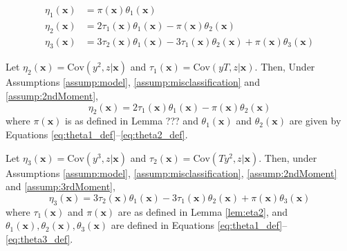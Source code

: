 \begin{align*}
 \eta_1(\mathbf{x}) &= \pi(\mathbf{x})\theta_1(\mathbf{x}) \\
  \eta_2(\mathbf{x}) &=  2\tau_1(\mathbf{x}) \theta_1(\mathbf{x}) - \pi(\mathbf{x})\theta_2(\mathbf{x}) \\
  \eta_3(\mathbf{x}) &=  3\tau_2(\mathbf{x}) \theta_1(\mathbf{x}) - 3\tau_1(\mathbf{x}) \theta_2(\mathbf{x}) + \pi(\mathbf{x})\theta_3(\mathbf{x})
\end{align*}




\begin{lem}
  Let $\eta_2(\mathbf{x}) = \mbox{Cov}(y^2,z|\mathbf{x})$ and $\tau_1(\mathbf{x}) = \mbox{Cov}(yT,z|\mathbf{x})$.
Then, Under Assumptions \ref{assump:model}, \ref{assump:misclassification} and \ref{assump:2ndMoment}, 
\[
    \eta_2(\mathbf{x}) =  2\tau_1(\mathbf{x}) \theta_1(\mathbf{x}) - \pi(\mathbf{x})\theta_2(\mathbf{x})
\]
where $\pi(\mathbf{x})$ is as defined in Lemma ??? and $\theta_1(\mathbf{x})$ and $\theta_2(\mathbf{x})$ are given by Equations \ref{eq:theta1_def}--\ref{eq:theta2_def}.
  \label{lem:eta2}
\end{lem}

 


\begin{lem}
  Let $\eta_3(\mathbf{x}) = \mbox{Cov}(y^3,z|\mathbf{x})$ and $\tau_2(\mathbf{x}) = \mbox{Cov}(Ty^2,z|\mathbf{x})$.
  Then, under Assumptions \ref{assump:model}, \ref{assump:misclassification}, \ref{assump:2ndMoment} and \ref{assump:3rdMoment},
\[
  \eta_3(\mathbf{x}) =  3\tau_2(\mathbf{x}) \theta_1(\mathbf{x}) - 3\tau_1(\mathbf{x}) \theta_2(\mathbf{x}) + \pi(\mathbf{x})\theta_3(\mathbf{x})
\]
where $\tau_1(\mathbf{x})$ and $\pi(\mathbf{x})$ are as defined in Lemma \ref{lem:eta2}, and $\theta_1(\mathbf{x}), \theta_2(\mathbf{x}), \theta_3(\mathbf{x})$ are defined in Equations \ref{eq:theta1_def}--\ref{eq:theta3_def}.
  \label{lem:eta3}
\end{lem}

